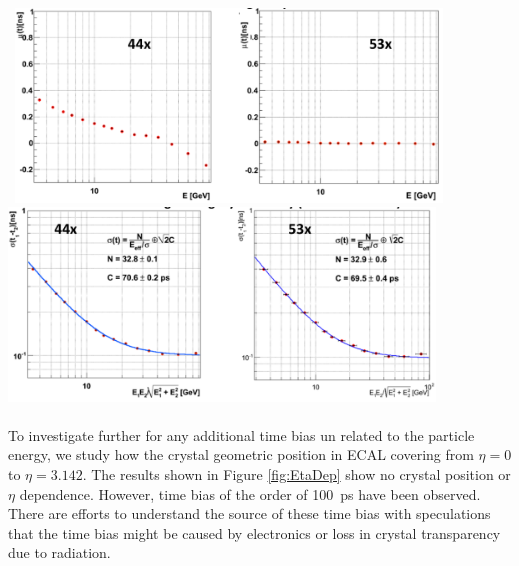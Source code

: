 \begin{center}
\centering
\mbox{
\includegraphics[height=0.450\textwidth, width=0.85\textwidth]{THESISPLOTS/AmplitudeVsTimeCMSSW_Comparison.png} } 
\vspace{5cm}
\mbox{
\includegraphics[height=0.460\textwidth, width=0.85\textwidth]{THESISPLOTS/TimingResolutionCMSSW_Comparison.png}
}
\vspace{-5cm}
\label{fig:TimeBias}
\end{center}

\paragraph*{}
To investigate further for any additional time bias un related to the particle energy, we study how the crystal geometric position in ECAL covering from $\eta = 0$ to $\eta = 3.142$. The results shown in Figure \ref{fig:EtaDep} show no crystal position or $\eta$ dependence. However, time bias of the order of 100~ps have been observed.
There are efforts to understand the source of these time bias with speculations that the time bias might be caused by electronics or loss in \pb crystal transparency due to radiation.

